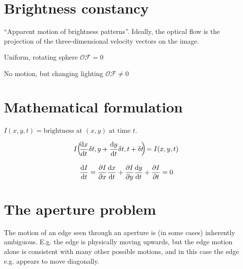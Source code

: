 \section{Brightness constancy}
\begin{compactdesc}
	\item[\lp{Definition of Optical Flow}] ``Apparent motion of brightness patterns''. Ideally, the optical flow is the projection of the three-dimensional velocity vectors on the image.
	\item[\lp{Caution required}]
		\begin{enumerate*}[label=\protect\circled{\arabic*}]
			\item Uniform, rotating sphere $\mathcal{OF}=0$
			\item No motion, but changing lighting $\mathcal{OF}\neq0$
		\end{enumerate*}
		\section{Mathematical formulation}
		$I(x,y,t)=\text{brightness at }(x,y)\text{ at time }t$.
	\item[\lp{Brightness constancy assumption:}]
		\begin{gather*}
			I\!\left(\!\! \frac{\mathrm d x}{\mathrm d t}\delta t,y+\frac{\mathrm d y}{\mathrm d t} \delta t,t+\delta t \!\!\right)\!=I(x,y,t)
		\end{gather*}
	\item[\lp{Optical flow constraint equation:}]
		\begin{gather*}
			\frac{\mathrm d I}{\mathrm d t}=\frac{\partial I}{\partial x}\frac{\mathrm d x}{\mathrm d t}+\frac{\partial I}{\partial y}\frac{\mathrm d y}{\mathrm d t}+\frac{\partial I}{\partial t}=0
		\end{gather*}
		\section{The aperture problem}
		The motion of an edge seen through an aperture is (in some cases) inherently ambiguous. E.g. the edge is physically moving upwards, but the edge motion alone is consistent with many other possible motions, and in this case the edge e.g. appears to move diagonally.

\end{compactdesc}
